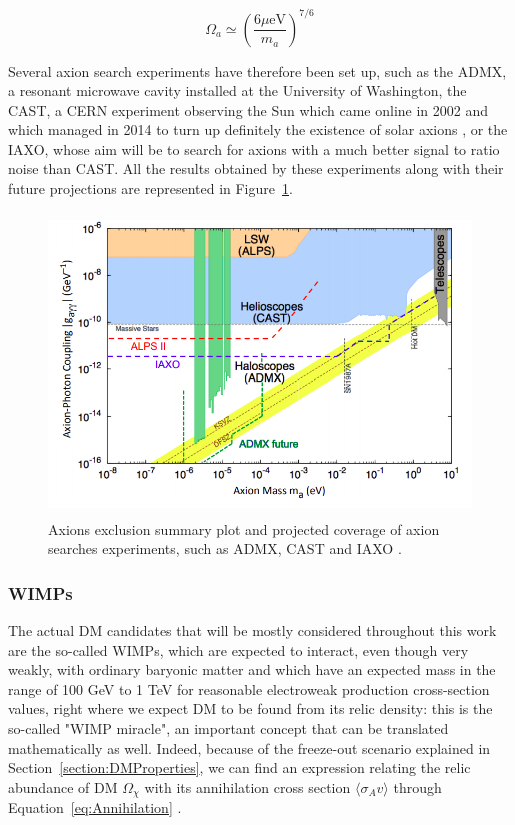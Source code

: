 \documentclass[a4paper, 10pt, openright]{report}
\begin{document}
\begin{equation}
\label{equation:AxionDensity}
\Omega_a \simeq \left ( \frac{6 \mu \text{eV}}{m_a} \right )^{7/6}
\end{equation}

Several axion search experiments have therefore been set up, such as the \ac{ADMX}, a resonant microwave cavity installed at the University of Washington, the \ac{CAST}, a CERN experiment observing the Sun which came online in 2002 and which managed in 2014 to turn up definitely the existence of solar axions \cite{CASTLimit}, or the \ac{IAXO}, whose aim will be to search for axions with a much better signal to ratio noise than \ac{CAST}. All the results obtained by these experiments along with their future projections are represented in Figure~\ref{figure:AxionSummary}.

\begin{figure}[htbp]
\begin{center}
\includegraphics[width=12cm, height=8cm]{figs/AxionSummary.png}
\caption{Axions exclusion summary plot and projected coverage of axion searches experiments, such as \ac{ADMX}, \ac{CAST} and \ac{IAXO} \cite{AxionSearches}.}
\label{figure:AxionSummary}
\end{center}
\end{figure}

\subsubsection*{\acfp{WIMP}} 
The actual \ac{DM} candidates that will be mostly considered throughout this work are the so-called \acp{WIMP}, which are expected to interact, even though very weakly, with ordinary baryonic matter and which have an expected mass in the range of 100 GeV to 1 TeV for reasonable electroweak production cross-section values, right where we expect \ac{DM} to be found from its relic density: this is the so-called "WIMP miracle", an important concept that can be translated mathematically as well. Indeed, because of the freeze-out scenario explained in Section~\ref{section:DMProperties}, we can find an expression relating the relic abundance of \ac{DM} $\Omega_\chi$ with its annihilation cross section $\langle \sigma_A v \rangle$ through Equation~\ref{eq:Annihilation} \cite{IndirectSearches}.
\end{document}
